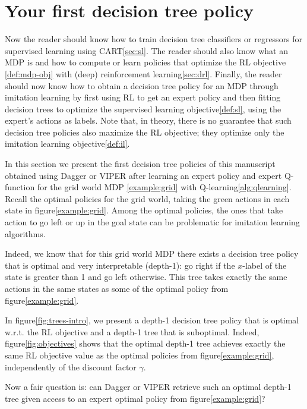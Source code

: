 \section{Your first decision tree policy}\label{sec:limits-il}
Now the reader should know how to train decision tree classifiers or regressors for supervised learning using CART\ref{sec:sl}.
The reader should also know what an MDP is and how to compute or learn policies that optimize the RL objective \ref{def:mdp-obj} with (deep) reinforcement learning\ref{sec:drl}.
Finally, the reader should now know how to obtain a decision tree policy for an MDP through imitation learning by first using RL to get an expert policy and then fitting decision trees to optimize the supervised learning objective\ref{def:sl}, using the expert's actions as labels.
Note that, in theory, there is no guarantee that such decision tree policies also maximize the RL objective; they optimize only the imitation learning objective\ref{def:il}.

In this section we present the first decision tree policies of this manuscript obtained using Dagger or VIPER after learning an expert policy and expert Q-function for the grid world MDP \ref{example:grid} with Q-learning\ref{alg:qlearning}.
Recall the optimal policies for the grid world, taking the green actions in each state in figure\ref{example:grid}. 
Among the optimal policies, the ones that take action to go left or up in the goal state can be problematic for imitation learning algorithms.

Indeed, we know that for this grid world MDP there exists a decision tree policy that is optimal and very interpretable (depth-1): go right if the $x$-label of the state is greater than 1 and go left otherwise.
This tree takes exactly the same actions in the same states as some of the optimal policy from figure\ref{example:grid}.

In figure\ref{fig:trees-intro}, we present a depth-1 decision tree policy that is optimal w.r.t. the RL objective and a depth-1 tree that is suboptimal.
Indeed, figure\ref{fig:objectives} shows that the optimal depth-1 tree achieves exactly the same RL objective value as the optimal policies from figure\ref{example:grid}, independently of the discount factor $\gamma$.

Now a fair question is: can Dagger or VIPER retrieve such an optimal depth-1 tree given access to an expert optimal policy from figure\ref{example:grid}?

